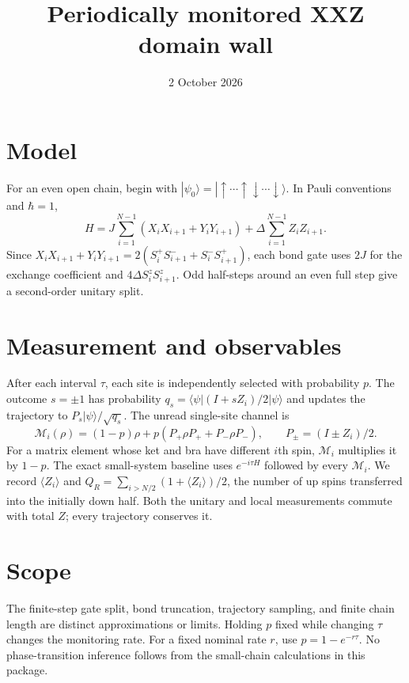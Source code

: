 \documentclass[11pt]{article}
\title{Periodically monitored XXZ domain wall}
\date{2 October 2026}
\begin{document}
\maketitle
\section*{Model}
For an even open chain, begin with
$|\psi_0\rangle=|\uparrow\cdots\uparrow\downarrow\cdots\downarrow\rangle$.
In Pauli conventions and $\hbar=1$,
\begin{equation}
H=J\sum_{i=1}^{N-1}(X_iX_{i+1}+Y_iY_{i+1})
+\Delta\sum_{i=1}^{N-1}Z_iZ_{i+1}.
\end{equation}
Since $X_iX_{i+1}+Y_iY_{i+1}=2(S_i^+S_{i+1}^-+S_i^-S_{i+1}^+)$,
each bond gate uses $2J$ for the exchange coefficient and $4\Delta S_i^zS_{i+1}^z$.
Odd half-steps around an even full step give a second-order unitary split.
\section*{Measurement and observables}
After each interval $\tau$, each site is independently selected with probability $p$.
The outcome $s=\pm1$ has probability
$q_s=\langle\psi|(I+sZ_i)/2|\psi\rangle$ and updates the trajectory to
$P_s|\psi\rangle/\sqrt{q_s}$.
The unread single-site channel is
\begin{equation}
\mathcal M_i(\rho)=(1-p)\rho+p(P_+\rho P_++P_-\rho P_-),
\qquad P_\pm=(I\pm Z_i)/2.
\end{equation}
For a matrix element whose ket and bra have different $i$th spin,
$\mathcal M_i$ multiplies it by $1-p$. The exact small-system baseline uses
$e^{-i\tau H}$ followed by every $\mathcal M_i$.
We record $\langle Z_i\rangle$ and
$Q_R=\sum_{i>N/2}(1+\langle Z_i\rangle)/2$, the number of up spins
transferred into the initially down half. Both the unitary and local
measurements commute with total $Z$; every trajectory conserves it.
\section*{Scope}
The finite-step gate split, bond truncation, trajectory sampling, and finite
chain length are distinct approximations or limits. Holding $p$ fixed while
changing $\tau$ changes the monitoring rate. For a fixed nominal rate
$r$, use $p=1-e^{-r\tau}$. No phase-transition inference follows from the
small-chain calculations in this package.
\end{document}
